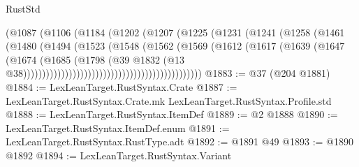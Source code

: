 \begin{lexlean}{RustStd}
\begin{coremodule}
                                                (@1087
                                                  (@1106
                                                    (@1184
                                                      (@1202
                                                        (@1207
                                                          (@1225
                                                            (@1231
                                                              (@1241
                                                                (@1258
                                                                  (@1461
                                                                    (@1480
                                                                      (@1494
                                                                        (@1523
                                                                          (@1548
                                                                            (@1562
                                                                              (@1569
                                                                                (@1612
                                                                                  (@1617
                                                                                    (@1639
                                                                                      (@1647
                                                                                        (@1674
                                                                                          (@1685
                                                                                            (@1798
                                                                                              (@39
                                                                                                @1832
                                                                                                (@13
                                                                                                  @38)))))))))))))))))))))))))))))))))))))))))))))))
@1883 := @37 (@204 @1881)
@1884 := LexLeanTarget.RustSyntax.Crate
@1887 := LexLeanTarget.RustSyntax.Crate.mk LexLeanTarget.RustSyntax.Profile.std
@1888 := LexLeanTarget.RustSyntax.ItemDef
@1889 := @2 @1888
@1890 := LexLeanTarget.RustSyntax.ItemDef.enum
@1891 := LexLeanTarget.RustSyntax.RustType.adt
@1892 := @1891 @49
@1893 := @1890 @1892
@1894 := LexLeanTarget.RustSyntax.Variant

\end{coremodule}
\end{lexlean}

